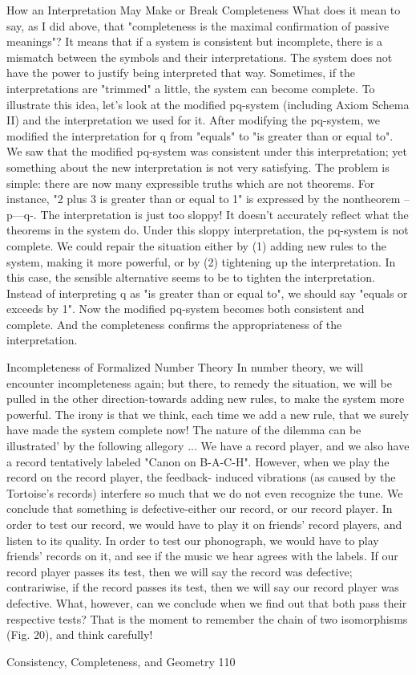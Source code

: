          How an Interpretation May Make or Break Completeness
What does it mean to say, as I did above, that "completeness is the maximal confirmation
of passive meanings"? It means that if a system is consistent but incomplete, there is a
mismatch between the symbols and their interpretations. The system does not have the
power to justify being interpreted that way. Sometimes, if the interpretations are
"trimmed" a little, the system can become complete. To illustrate this idea, let's look at
the modified pq-system (including Axiom Schema II) and the interpretation we used for
it.
        After modifying the pq-system, we modified the interpretation for q from "equals"
to "is greater than or equal to". We saw that the modified pq-system was consistent under
this interpretation; yet something about the new interpretation is not very satisfying. The
problem is simple: there are now many expressible truths which are not theorems. For
instance, "2 plus 3 is greater than or equal to 1" is expressed by the nontheorem --p---q-.
The interpretation is just too sloppy! It doesn't accurately reflect what the theorems in the
system do. Under this sloppy interpretation, the pq-system is not complete. We could
repair the situation either by (1) adding new rules to the system, making it more
powerful, or by (2) tightening up the interpretation. In this case, the sensible alternative
seems to be to tighten the interpretation. Instead of interpreting q as "is greater than or
equal to", we should say "equals or exceeds by 1". Now the modified pq-system becomes
both consistent and complete. And the completeness confirms the appropriateness of the
interpretation.

                Incompleteness of Formalized Number Theory
In number theory, we will encounter incompleteness again; but there, to remedy the
situation, we will be pulled in the other direction-towards adding new rules, to make the
system more powerful. The irony is that we think, each time we add a new rule, that we
surely have made the system complete now! The nature of the dilemma can be illustrated'
by the following allegory ...
        We have a record player, and we also have a record tentatively labeled "Canon on
B-A-C-H". However, when we play the record on the record player, the feedback-
induced vibrations (as caused by the Tortoise's records) interfere so much that we do not
even recognize the tune. We conclude that something is defective-either our record, or
our record player. In order to test our record, we would have to play it on friends' record
players, and listen to its quality. In order to test our phonograph, we would have to play
friends' records on it, and see if the music we hear agrees with the labels. If our record
player passes its test, then we will say the record was defective; contrariwise, if the
record passes its test, then we will say our record player was defective. What, however,
can we conclude when we find out that both pass their respective tests? That is the
moment to remember the chain of two isomorphisms (Fig. 20), and think carefully!




Consistency, Completeness, and Geometry                                                  110

